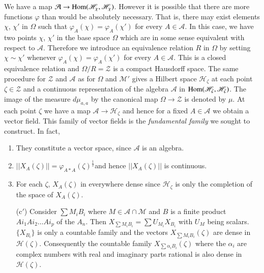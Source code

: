 We have a map $\mathcal{A}\to \operatorname{Hom} (\mathscr{H}_\chi,
\mathscr{H}_\chi)$. However it is possible that there are more functions
$\varphi$ than would be absolutely necessary. 
That is, there may exist elements $\chi$, $\chi'$ in $\Omega$ such that
$\varphi_A(\chi)=\varphi_A(\chi')$ for every $A \in \mathcal{A}$. In
this case, we have two points $\chi$, $\chi'$ in the base space $\Omega$
which are in some sense equivalent with respect to
$\mathcal{A}$. Therefore we introduce an equivalence relation $R$ in
$\Omega$ by setting $\chi \sim \chi'$ whenever $\varphi_A (\chi)
=\varphi_A(\chi')$ for every $A \in \mathcal{A}$. This is a closed
equivalence relation and $\Omega/R=\mathcal{Z}$ is a compact Hausdorff
space. The same procedure for $\mathcal{Z}$ and $\mathcal{A}$ as for
$\Omega$ and $\mathscr{M}'$ gives a Hilbert space $\mathcal{H}_\zeta$ at each
point $\zeta \in \mathcal{Z}$  and a continuous representation of the
algebra $\mathcal{A}$ in $\operatorname{Hom} (\mathscr{H}_\zeta,
\mathscr{H}_{\zeta})$. The
image of the measure $d \mu_{a, a}$ by the canonical map $\Omega \to
\mathcal{Z}$ is denoted by $\mu$. At each point $\zeta$ we have a map
$\mathcal{A} \to \mathcal{H}_\zeta$ and hence for a  fixed $A \in
\mathcal{A}$ we obtain a vector field. This family of vector fields is
the \textit{fundamental family} we sought to construct. In fact,  
\begin{enumerate}
\renewcommand{\theenumi}{\alph{enumi}}
\renewcommand{\labelenumi}{(\theenumi)}
\item They constitute a vector space, since $\mathcal{A}$ is an algebra.

\item $||
  X_A(\zeta)||=\varphi_{A*A}(\zeta)^{\frac{1}{2}}$\pageoriginale and
  hence $|| X_A(\zeta)||$ is continuous. 

\item For each $\zeta$, $X_A(\zeta)$ in everywhere dense since
  $\mathscr{H}_\zeta$ is only the completion of the space of
  $X_A(\zeta)$. 

\item[(c$'$)] Consider $\sum M_i B_i$ where $M \in \mathcal{A}\cap
  \mathscr{M}$ and $B$ is a finite product $Ai_1 Ai_2 \ldots Ai_p$ of
  the $A_n$. Then 
  $X_{\sum M_{i} B_{i}} =\sum U_{M_{i}} X_{B_{i}}$ with $U_M$ being
  scalars. $\{X_{B_{i}}\}$ is only a countable family and the vectors
  $X_{\sum M_i B_i}(\zeta)$ are dense in
  $\mathscr{H}(\zeta)$. Consequently the countable family $X_{\sum
    \alpha_i B_i}(\zeta)$  where the $\alpha_i$ are complex numbers
  with real and imaginary parts rational is also dense in
  $\mathscr{H}(\zeta)$. 
\end{enumerate}

